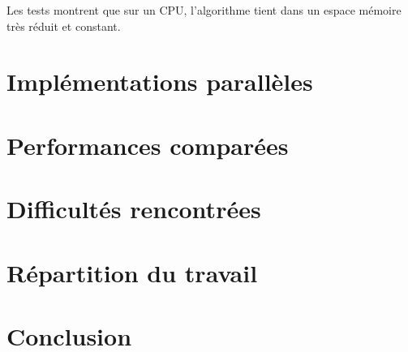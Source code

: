 \documentclass{article}
\begin{document}
Les tests montrent que sur un \textsc{CPU}, l'algorithme tient dans un espace mémoire très réduit et constant.






\section{Implémentations parallèles}


\section{Performances comparées}


\section{Difficultés rencontrées}

\section{Répartition du travail}


\section{Conclusion}
\end{document}
